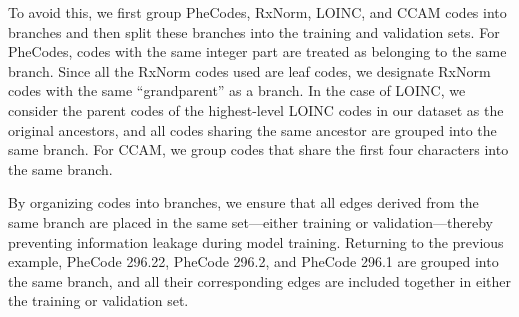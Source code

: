 \documentclass{article}
\begin{document}
To avoid this, we first group PheCodes, RxNorm, LOINC, and CCAM codes into branches and then split these branches into the training and validation sets. For PheCodes, codes with the same integer part are treated as belonging to the same branch. Since all the RxNorm codes used are leaf codes, we designate RxNorm codes with the same ``grandparent'' as a branch. In the case of LOINC, we consider the parent codes of the highest-level LOINC codes in our dataset as the original ancestors, and all codes sharing the same ancestor are grouped into the same branch. For CCAM, we group codes that share the first four characters into the same branch.

By organizing codes into branches, we ensure that all edges derived from the same branch are placed in the same set—either training or validation—thereby preventing information leakage during model training. Returning to the previous example, PheCode 296.22, PheCode 296.2, and PheCode 296.1 are grouped into the same branch, and all their corresponding edges are included together in either the training or validation set.
\end{document}
